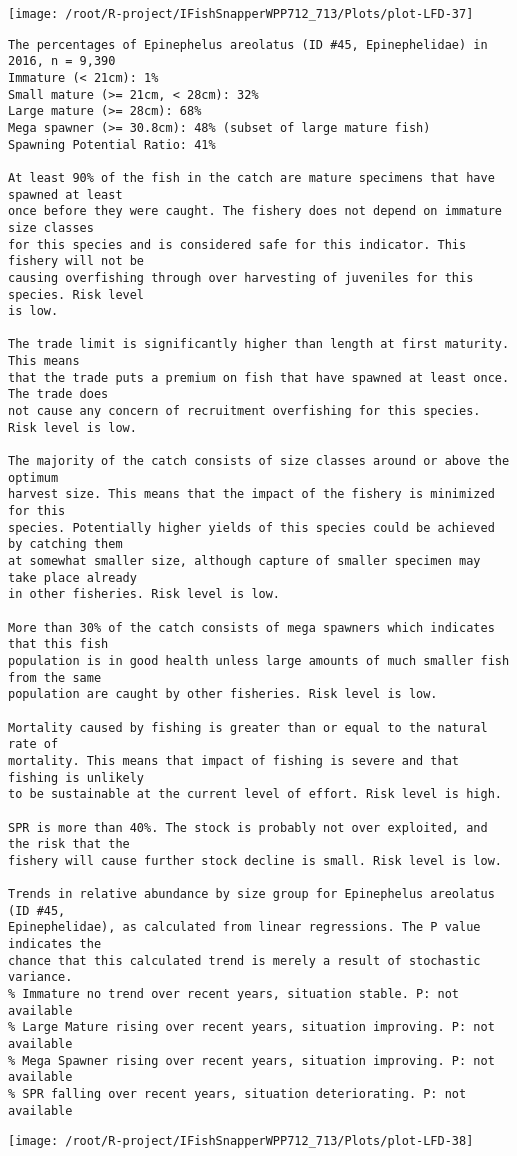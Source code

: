 \documentclass{report}\usepackage[]{graphicx}\usepackage[]{color}
\makeatletter
\def\maxwidth{ %
  \ifdim\Gin@nat@width>\linewidth
    \linewidth
  \else
    \Gin@nat@width
  \fi
}
\newenvironment{kframe}{%
 \def\at@end@of@kframe{}%
 \ifinner\ifhmode%
  \def\at@end@of@kframe{\end{minipage}}%
  \begin{minipage}{\columnwidth}%
 \fi\fi%
 \def\FrameCommand##1{\hskip\@totalleftmargin \hskip-\fboxsep
 \colorbox{shadecolor}{##1}\hskip-\fboxsep
     \hskip-\linewidth \hskip-\@totalleftmargin \hskip\columnwidth}%
 \MakeFramed {\advance\hsize-\width
   \@totalleftmargin\z@ \linewidth\hsize
   \@setminipage}}%
 {\par\unskip\endMakeFramed%
 \at@end@of@kframe}
\newenvironment{knitrout}{}{} %
\makeatother
\begin{document}
\begin{knitrout}
\texttt{[image: /root/R-project/IFishSnapperWPP712\_713/Plots/plot-LFD-37]} 
\begin{kframe}\begin{verbatim}
The percentages of Epinephelus areolatus (ID #45, Epinephelidae) in 2016, n = 9,390
Immature (< 21cm): 1%
Small mature (>= 21cm, < 28cm): 32%
Large mature (>= 28cm): 68%
Mega spawner (>= 30.8cm): 48% (subset of large mature fish)
Spawning Potential Ratio: 41%
 
At least 90% of the fish in the catch are mature specimens that have spawned at least
once before they were caught. The fishery does not depend on immature size classes
for this species and is considered safe for this indicator. This fishery will not be
causing overfishing through over harvesting of juveniles for this species. Risk level
is low.

The trade limit is significantly higher than length at first maturity.  This means
that the trade puts a premium on fish that have spawned at least once. The trade does
not cause any concern of recruitment overfishing for this species. Risk level is low.

The majority of the catch consists of size classes around or above the optimum
harvest size. This means that the impact of the fishery is minimized for this
species. Potentially higher yields of this species could be achieved by catching them
at somewhat smaller size, although capture of smaller specimen may take place already
in other fisheries. Risk level is low.

More than 30% of the catch consists of mega spawners which indicates that this fish
population is in good health unless large amounts of much smaller fish from the same
population are caught by other fisheries. Risk level is low.
 
Mortality caused by fishing is greater than or equal to the natural rate of
mortality. This means that impact of fishing is severe and that fishing is unlikely
to be sustainable at the current level of effort. Risk level is high.
 
SPR is more than 40%. The stock is probably not over exploited, and the risk that the
fishery will cause further stock decline is small. Risk level is low.
 
Trends in relative abundance by size group for Epinephelus areolatus (ID #45,
Epinephelidae), as calculated from linear regressions. The P value indicates the
chance that this calculated trend is merely a result of stochastic variance.
% Immature no trend over recent years, situation stable. P: not available
% Large Mature rising over recent years, situation improving. P: not available
% Mega Spawner rising over recent years, situation improving. P: not available
% SPR falling over recent years, situation deteriorating. P: not available
\end{verbatim}
\end{kframe}
\texttt{[image: /root/R-project/IFishSnapperWPP712\_713/Plots/plot-LFD-38]} 


\end{knitrout}
\end{document}
